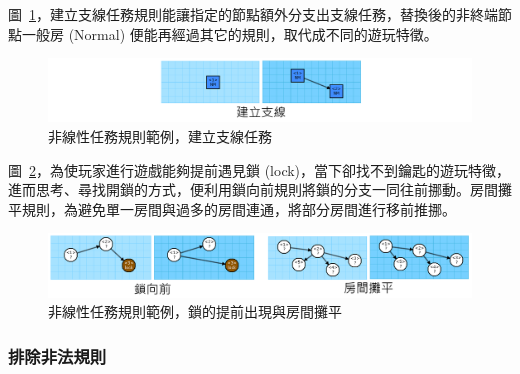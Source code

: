 圖~\ref{fig:missiongrammars-rules-nonlinear-example2}，建立支線任務規則能讓指定的節點額外分支出支線任務，替換後的非終端節點一般房 (Normal) 便能再經過其它的規則，取代成不同的遊玩特徵。
 
\begin{figure}[ht]
  \begin{center}
    \includegraphics[width=1.0\textwidth]{figures/missiongrammars-rules-nonlinear-example2.png}
    \caption{非線性任務規則範例，建立支線任務}
    \label{fig:missiongrammars-rules-nonlinear-example2}
  \end{center}
\end{figure}

圖~\ref{fig:missiongrammars-rules-nonlinear-example3}，為使玩家進行遊戲能夠提前遇見鎖 (lock)，當下卻找不到鑰匙的遊玩特徵，進而思考、尋找開鎖的方式，便利用鎖向前規則將鎖的分支一同往前挪動。房間攤平規則，為避免單一房間與過多的房間連通，將部分房間進行移前推挪。
 
\begin{figure}[ht]
  \begin{center}
    \includegraphics[width=1.0\textwidth]{figures/missiongrammars-rules-nonlinear-example3.png}
    \caption{非線性任務規則範例，鎖的提前出現與房間攤平}
    \label{fig:missiongrammars-rules-nonlinear-example3}
  \end{center}
\end{figure}



\subsubsection{排除非法規則}
\label{sssec:method-missiongrammars-rules-illegals}

